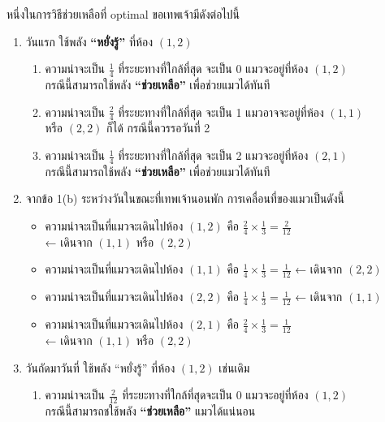 หนึ่งในการวิธีช่วยเหลือที่ optimal ขอเทพเจ้ามีดังต่อไปนี้
\begin{enumerate}
\item วันแรก ใช้พลัง \textbf{“หยั่งรู้”} ที่ห้อง $(1,2)$
    \begin{enumerate}
        \item ความน่าจะเป็น $\frac{1}{4}$ ที่ระยะทางที่ใกล้ที่สุด 
            จะเป็น $0$ แมวจะอยู่ที่ห้อง $(1,2)$ \\
            กรณีนี้สามารถใช้พลัง \textbf{“ช่วยเหลือ”} เพื่อช่วยแมวได้ทันที
        \item ความน่าจะเป็น $\frac{2}{4}$ ที่ระยะทางที่ใกล้ที่สุด 
            จะเป็น 1 แมวอาจจะอยู่ที่ห้อง $(1,1)$ \\
            หรือ $(2,2)$ ก็ได้\; กรณีนี้ควรรอวันที่ 2
        \item ความน่าจะเป็น $\frac{1}{4}$ ที่ระยะทางที่ใกล้ที่สุด 
            จะเป็น 2 แมวจะอยู่ที่ห้อง $(2,1)$ \\
            กรณีนี้สามารถใช้พลัง \textbf{“ช่วยเหลือ”} เพื่อช่วยแมวได้ทันที
    \end{enumerate}
\item จากข้อ 1{\hrsp}(b) ระหว่างวันในขณะที่เทพเจ้านอนพัก การเคลื่อนที่ของแมวเป็นดังนี้
    \begin{itemize}
        \item ความน่าจะเป็นที่แมวจะเดินไปห้อง $(1,2)$ คือ 
            $\frac{2}{4}\times\frac{1}{3}=\frac{2}{12}$ \\ 
            ← เดินจาก $(1,1)$ หรือ $(2,2)$
        \item ความน่าจะเป็นที่แมวจะเดินไปห้อง $(1,1)$ คือ 
            $\frac{1}{4}\times\frac{1}{3}=\frac{1}{12}$ ← เดินจาก $(2,2)$
        \item ความน่าจะเป็นที่แมวจะเดินไปห้อง $(2,2)$ คือ 
            $\frac{1}{4}\times\frac{1}{3}=\frac{1}{12}$ ← เดินจาก $(1,1)$
        \item ความน่าจะเป็นที่แมวจะเดินไปห้อง $(2,1)$ คือ 
            $\frac{2}{4}\times\frac{1}{3}=\frac{1}{12}$ \\
            ← เดินจาก $(1,1)$ หรือ $(2,2)$
    \end{itemize}
\item วันถัดมาวันที่ ใช้พลัง “หยั่งรู้” ที่ห้อง $(1,2)$ เช่นเดิม
    \begin{enumerate}
        \item ความน่าจะเป็น $\frac{2}{12}$ ที่ระยะทางที่ใกล้ที่สุดจะเป็น 0 
            แมวจะอยู่ที่ห้อง $(1,2)$ \\
            กรณีนี้สามารถชใช้พลัง \textbf{“ช่วยเหลือ”} แมวได้แน่นอน

\end{enumerate}
\end{enumerate}

